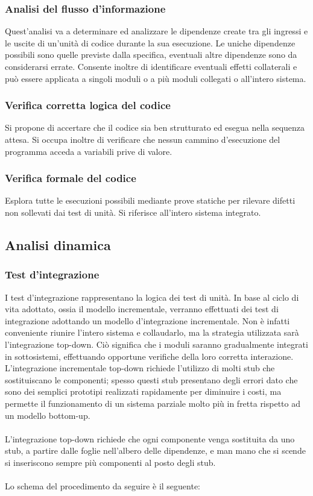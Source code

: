 \subsubsection*{Analisi del flusso d'informazione}

Quest'analisi va a determinare ed analizzare le dipendenze create tra gli
ingressi e le uscite di un'unit\`a di codice durante la sua esecuzione. Le uniche
dipendenze possibili sono quelle previste dalla specifica, eventuali altre
dipendenze sono da considerarsi errate. Consente inoltre di identificare
eventuali effetti collaterali e pu\`o essere applicata a singoli moduli o a pi\`u
moduli collegati o all'intero sistema.

\subsubsection*{Verifica corretta logica del codice}

Si propone di accertare che il codice sia ben strutturato ed esegua nella
sequenza attesa. Si occupa inoltre di verificare che nessun cammino
d'esecuzione del programma acceda a variabili prive di valore.

\subsubsection*{Verifica formale del codice}

Esplora tutte le esecuzioni possibili mediante prove statiche per rilevare
difetti non sollevati dai test di unit\`a. Si riferisce all'intero sistema integrato.

\subsection{Analisi dinamica}
\subsubsection*{Test d'integrazione}
I test d'integrazione rappresentano la logica dei test di unit\`a.
In base al ciclo di vita adottato, ossia il modello incrementale, verranno effettuati dei 
test di integrazione adottando un modello d'integrazione incrementale. 
Non \`e infatti conveniente riunire l'intero sistema e collaudarlo, ma la
strategia utilizzata sar\`a l'integrazione top-down. Ci\`o significa che i
moduli saranno gradualmente integrati in sottosistemi, effettuando opportune verifiche della loro  corretta interazione. 
L'integrazione incrementale top-down richiede l'utilizzo di molti stub che
sostituiscano le componenti; spesso questi stub presentano degli errori dato che sono dei semplici 
prototipi realizzati rapidamente per diminuire i costi, ma permette il funzionamento di 
un sistema parziale molto pi\`u in fretta rispetto ad un modello bottom-up.\\
\\
L'integrazione top-down richiede che ogni componente venga sostituita da uno
stub, a partire dalle foglie nell'albero delle dipendenze, e man mano che si scende si 
inseriscono sempre pi\`u componenti al posto degli stub. \\ \\
Lo schema del procedimento da seguire \`e il seguente:

